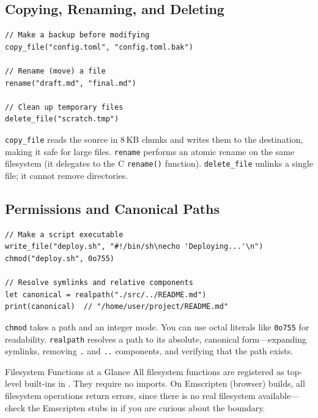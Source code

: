 \subsection{Copying, Renaming, and Deleting}\label{sec:copy-rename-delete}


\begin{lstlisting}[language=Lattice, caption={File operations: copy, rename, delete}]
// Make a backup before modifying
copy_file("config.toml", "config.toml.bak")

// Rename (move) a file
rename("draft.md", "final.md")

// Clean up temporary files
delete_file("scratch.tmp")
\end{lstlisting}

\lstinline|copy_file| reads the source in 8\,KB chunks and writes them to the
destination, making it safe for large files. \lstinline|rename| performs an
atomic rename on the same filesystem (it delegates to the C
\texttt{rename()} function). \lstinline|delete_file| unlinks a single file;
it cannot remove directories.

\subsection{Permissions and Canonical Paths}\label{sec:chmod-realpath}


\begin{lstlisting}[language=Lattice, caption={Changing permissions and resolving paths}]
// Make a script executable
write_file("deploy.sh", "#!/bin/sh\necho 'Deploying...'\n")
chmod("deploy.sh", 0o755)

// Resolve symlinks and relative components
let canonical = realpath("./src/../README.md")
print(canonical)  // "/home/user/project/README.md"
\end{lstlisting}

\lstinline|chmod| takes a path and an integer mode. You can use octal
literals like \lstinline|0o755| for readability. \lstinline|realpath| resolves
a path to its absolute, canonical form---expanding symlinks, removing
\texttt{.} and \texttt{..} components, and verifying that the path exists.

\begin{defnbox}{Filesystem Functions at a Glance}
All filesystem functions are registered as top-level built-ins in
. They require no imports. On Emscripten (browser)
builds, all filesystem operations return errors, since there is no real
filesystem available---check the Emscripten stubs in
 if you are curious about the boundary.
\end{defnbox}

